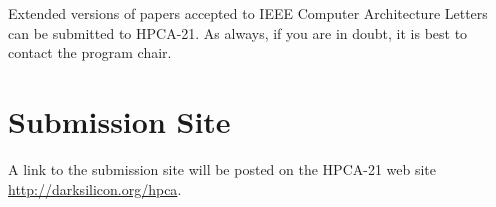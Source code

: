 \documentclass[pageno]{jpaper}
\begin{document}
Extended versions of papers accepted to IEEE Computer Architecture
Letters can be submitted to HPCA-21.
As always, if you are in doubt, it is best to contact the program chair. 

\section{Submission Site}

A link to the submission site will be posted on the HPCA-21 web site
\href{http://darksilicon.org/hpca}{http://darksilicon.org/hpca}. 



\end{document}
